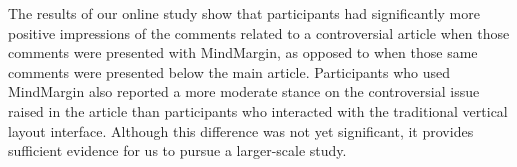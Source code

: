 The results of our online study show that participants had significantly more positive impressions of the comments related to a controversial article when those comments were presented with MindMargin, as opposed to when those same comments were presented below the main article.  Participants who used MindMargin also reported a more moderate stance on the controversial issue raised in the article than participants who interacted with the traditional vertical layout interface.  Although this difference was not yet significant, it provides sufficient evidence for us to pursue a larger-scale study.



